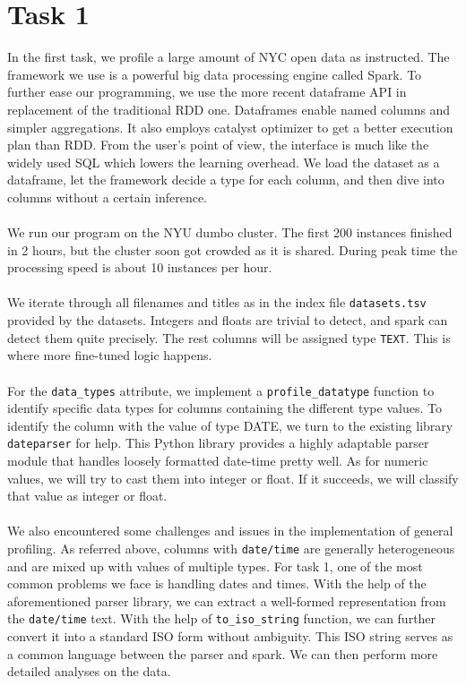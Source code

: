 \documentclass[sigconf]{acmart}
\begin{document}
\section{Task 1}
In the first task, we profile a large amount of NYC open data as instructed. The framework we use is a powerful big data processing engine called Spark. To further ease our programming, we use the more recent dataframe API in replacement of the traditional RDD one. Dataframes enable named columns and simpler aggregations. It also employs catalyst optimizer to get a better execution plan than RDD. From the user's point of view, the interface is much like the widely used SQL which lowers the learning overhead. We load the dataset as a dataframe, let the framework decide a type for each column, and then dive into columns without a certain inference.
\\\\
We run our program on the NYU dumbo cluster. The first 200 instances finished in 2 hours, but the cluster soon got crowded as it is shared. During peak time the processing speed is about 10 instances per hour.
\\\\
We iterate through all filenames and titles as in the index file \verb|datasets.tsv| provided by the datasets. Integers and floats are trivial to detect, and spark can detect them quite precisely. The rest columns will be assigned type \verb|TEXT|. This is where more fine-tuned logic happens.
\\\\
For the \verb|data_types| attribute, we implement a \verb|profile_datatype| function to identify specific data types for columns containing the different type values. To identify the column with the value of type DATE, we turn to the existing library \verb|dateparser| for help. This Python library provides a highly adaptable parser module that handles loosely formatted date-time pretty well. As for numeric values, we will try to cast them into integer or float. If it succeeds, we will classify that value as integer or float.
\\\\
We also encountered some challenges and issues in the implementation of general profiling. As referred above, columns with \verb|date/time| are generally heterogeneous and are mixed up with values of multiple types. For task 1, one of the most common problems we face is handling dates and times. With the help of the aforementioned parser library, we can extract a well-formed representation from the \verb|date/time| text. With the help of \verb|to_iso_string| function, we can further convert it into a standard ISO form without ambiguity. This ISO string serves as a common language between the parser and spark. We can then perform more detailed analyses on the data.
\end{document}
